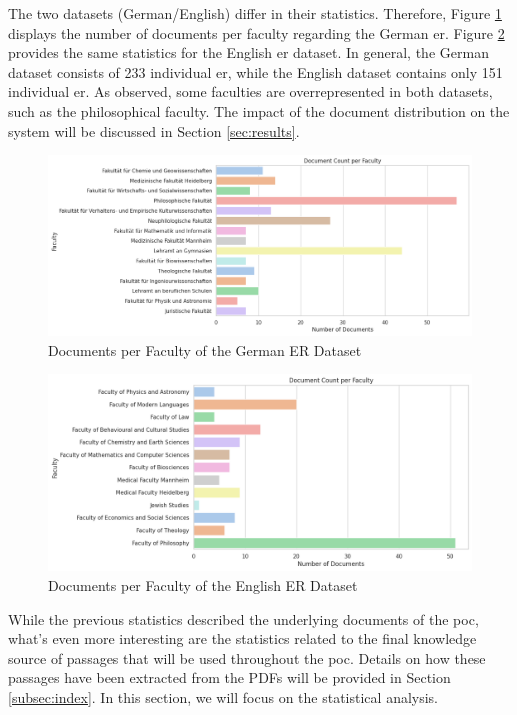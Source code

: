 The two datasets (German/English) differ in their statistics. Therefore, Figure \ref{fig:er-german-stats} displays the number of documents per faculty regarding the German \gls{er}. Figure \ref{fig:er-english-stats} provides the same statistics for the English \gls{er} dataset. In general, the German dataset consists of 233 individual \gls{er}, while the English dataset contains only 151 individual \gls{er}. As observed, some faculties are overrepresented in both datasets, such as the philosophical faculty. The impact of the document distribution on the system will be discussed in Section \ref{sec:results}.

\begin{figure}
    \centering
    \includegraphics[width=\textwidth]{Grafiken/Statistiken/PO_german_Document Count per Faculty.png}
    \caption{Documents per Faculty of the German ER Dataset}
    \label{fig:er-german-stats}
\end{figure}

\begin{figure}
    \centering
    \includegraphics[width=\textwidth]{Grafiken/Statistiken/PO_english_Document Count per Faculty.png}
    \caption{Documents per Faculty of the English ER Dataset}
    \label{fig:er-english-stats}
\end{figure}

While the previous statistics described the underlying documents of the \gls{poc}, what's even more interesting are the statistics related to the final knowledge source of passages that will be used throughout the \gls{poc}. Details on how these passages have been extracted from the PDFs will be provided in Section \ref{subsec:index}. In this section, we will focus on the statistical analysis.

